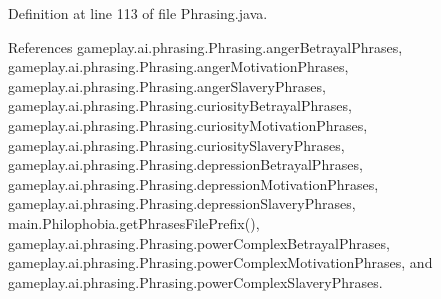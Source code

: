 Definition at line 113 of file Phrasing.\-java.



References gameplay.\-ai.\-phrasing.\-Phrasing.\-anger\-Betrayal\-Phrases, gameplay.\-ai.\-phrasing.\-Phrasing.\-anger\-Motivation\-Phrases, gameplay.\-ai.\-phrasing.\-Phrasing.\-anger\-Slavery\-Phrases, gameplay.\-ai.\-phrasing.\-Phrasing.\-curiosity\-Betrayal\-Phrases, gameplay.\-ai.\-phrasing.\-Phrasing.\-curiosity\-Motivation\-Phrases, gameplay.\-ai.\-phrasing.\-Phrasing.\-curiosity\-Slavery\-Phrases, gameplay.\-ai.\-phrasing.\-Phrasing.\-depression\-Betrayal\-Phrases, gameplay.\-ai.\-phrasing.\-Phrasing.\-depression\-Motivation\-Phrases, gameplay.\-ai.\-phrasing.\-Phrasing.\-depression\-Slavery\-Phrases, main.\-Philophobia.\-get\-Phrases\-File\-Prefix(), gameplay.\-ai.\-phrasing.\-Phrasing.\-power\-Complex\-Betrayal\-Phrases, gameplay.\-ai.\-phrasing.\-Phrasing.\-power\-Complex\-Motivation\-Phrases, and gameplay.\-ai.\-phrasing.\-Phrasing.\-power\-Complex\-Slavery\-Phrases.


